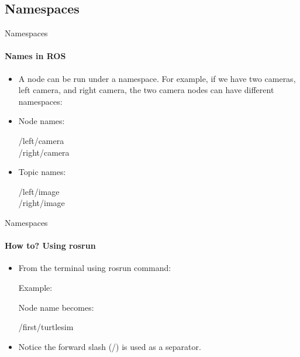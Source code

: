 \documentclass{beamer}
\begin{document}
\subsection{Namespaces}
\begin{frame}{Namespaces}
    \framesubtitle{Names in ROS}
    \begin{itemize}
        
        
        
        \item A node can be run under a namespace. For example, if we have two cameras, left camera, and right camera, the two {\ttfamily \colorbox{gray!30!white}{camera}} nodes can have different namespaces:
       
       \item Node names:
       \begin{focus}
         /left/camera\\ /right/camera  
        \end{focus} 
        
        \item Topic names:
        
              \begin{focus}
                  /left/image\\ /right/image  
               \end{focus}  
    \end{itemize}  
\end{frame}


\begin{frame}{Namespaces}
    \framesubtitle{How to? Using rosrun}
    \begin{itemize}     
        \item From the terminal using {\ttfamily \colorbox{gray!30!white}{rosrun}} command:
        \begin{terminal}
            \color{green} \fontsize{9}{1} 
        \end{terminal} 
        
        Example:
                \begin{terminal}
                    \color{green} \fontsize{9}{1} 
                \end{terminal} 
                
                        
                        Node name becomes:
                \begin{focus}
                  /first/turtlesim  
                    \end{focus}
    \item Notice the forward slash (/) is used as a separator.
    \end{itemize}  
\end{frame}
\end{document}
